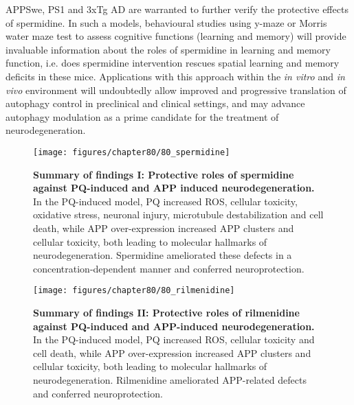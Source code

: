 APPSwe, PS1 and 3xTg AD are warranted to further verify the protective effects of spermidine. In such a models, behavioural studies using y-maze or Morris water maze test  to assess cognitive functions (learning and memory) will provide invaluable information about the roles of spermidine in learning and memory function, i.e. does spermidine intervention rescues spatial learning and memory deficits in these mice. Applications with this approach within the \textit{in vitro} and \textit{in vivo} environment will undoubtedly allow improved and progressive translation of autophagy control in preclinical and clinical settings, and may advance autophagy modulation as a prime candidate for the treatment of neurodegeneration.

\begin{landscape}
\begin{figure}[!htbp]
\vspace{2.5cm}
\center
 \texttt{[image: figures/chapter80/80\_spermidine]}
 \caption[Summary of findings I: Protective roles of spermidine against PQ-induced and APP induced neurodegeneration]{\textbf{Summary of findings I: Protective roles of spermidine against PQ-induced and APP induced neurodegeneration.}  In the PQ-induced model, PQ increased ROS, cellular toxicity, oxidative stress, neuronal injury, microtubule destabilization and cell death, while APP over-expression increased APP clusters and cellular toxicity, both leading to molecular hallmarks of neurodegeneration. Spermidine ameliorated these defects in a concentration-dependent manner and conferred neuroprotection.}
 \label{fig:80_spermidine}
\end{figure} 
\end{landscape} 
 
 \begin{landscape}
\begin{figure}[!htbp]
\vspace{3cm}
\center
 \texttt{[image: figures/chapter80/80\_rilmenidine]}
 \caption[Summary of findings II: Protective roles of rilmenidine against PQ-induced and APP-induced neurodegeneration]{\textbf{Summary of findings II: Protective roles of rilmenidine against PQ-induced and APP-induced neurodegeneration.}  In the PQ-induced model, PQ increased ROS, cellular toxicity and cell death, while APP over-expression increased APP clusters and cellular toxicity, both leading to molecular hallmarks of neurodegeneration. Rilmenidine ameliorated APP-related defects and conferred neuroprotection.}
 \label{fig:80_rilmenidine}
\end{figure} 
\end{landscape} 






















